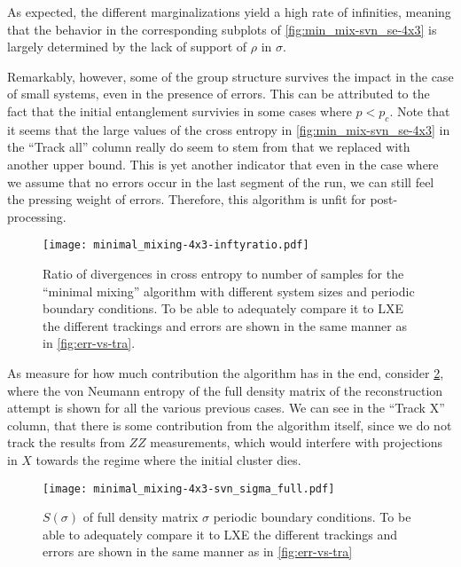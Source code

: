 As expected, the different marginalizations yield a high rate of infinities,
meaning that the behavior in the corresponding subplots of
\cref{fig:min_mix-svn_se-4x3} is largely determined by the lack of support of
$\rho$ in $\sigma$.
 
Remarkably, however, some of the group structure survives the impact in the
case of small systems, even in the presence of errors.  This can be attributed
to the fact that the initial entanglement survivies in some cases where $p <
p_c$.  Note that it seems that the large values of the cross entropy in
\cref{fig:min_mix-svn_se-4x3} in the \enquote{Track all} column really do seem
to stem from that we replaced with another upper bound.  This is yet another
indicator that even in the case where we assume that no errors occur in the
last segment of the run, we can still feel the pressing weight of errors.
Therefore, this algorithm is unfit for post-processing.

\begin{figure}[p]
  \centering
  \texttt{[image: minimal\_mixing-4x3-inftyratio.pdf]}
  \caption{Ratio of divergences in cross entropy to number of samples for the
    \enquote{minimal mixing} algorithm with
    different system sizes and
  periodic boundary conditions. To be able to adequately compare it to LXE the
different trackings and errors are shown in the same manner as in
\cref{fig:err-vs-tra}.}
  \label{fig:min_mix-inftyratio-4x3}
\end{figure}

  
As measure for how much contribution the algorithm has in the end, consider
\cref{fig:min_mix-svn_sigma_full-4x3}, where the von Neumann entropy of the
full density matrix of the reconstruction attempt is shown for all the various
previous cases.  We can see in the \enquote{Track X} column, that there is some
contribution from the algorithm itself, since we do not track the results from
$ZZ$ measurements, which would interfere with projections in $X$ towards the
regime where the initial cluster dies. 

\begin{figure}[p]
  \centering
  \texttt{[image: minimal\_mixing-4x3-svn\_sigma\_full.pdf]}
  \caption{$S(\sigma)$ of full density matrix $\sigma$ 
  periodic boundary conditions. To be able to adequately compare it to LXE the
different trackings and errors are shown in the same manner as in
\cref{fig:err-vs-tra}}
  \label{fig:min_mix-svn_sigma_full-4x3}
\end{figure}

